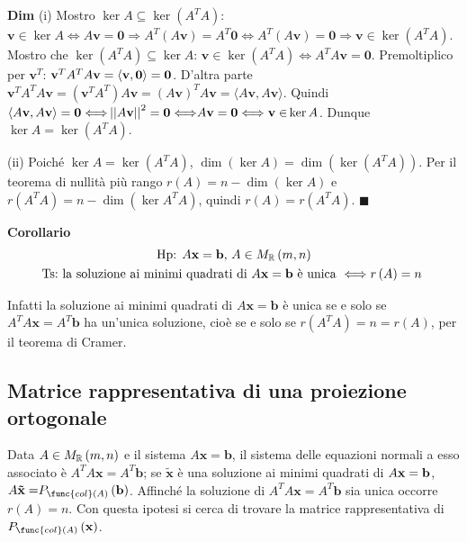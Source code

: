 \documentclass{article}
\begin{document}
\textbf{Dim} (i) Mostro $\ker A\subseteq \ker \left( A^{T}A\right) $: $%
\mathbf{v}\in \ker A\Longleftrightarrow A\mathbf{v=0\Longrightarrow }%
A^{T}\left( A\mathbf{v}\right) \mathbf{=}A^{T}\mathbf{0}\Longleftrightarrow
A^{T}\left( A\mathbf{v}\right) =\mathbf{0\Longrightarrow v\in }\ker \left(
A^{T}A\right) $. Mostro che $\ker \left( A^{T}A\right) \subseteq \ker A$: $%
\mathbf{v}\in \ker \left( A^{T}A\right) \Longleftrightarrow A^{T}A\mathbf{v=0%
}$. Premoltiplico per $\mathbf{v}^{T}$: $\mathbf{v}^{T}A^{T}A\mathbf{%
v=\langle v},\mathbf{0\rangle =0}$. D'altra parte $\mathbf{v}^{T}A^{T}A%
\mathbf{v=}\left( \mathbf{v}^{T}A^{T}\right) A\mathbf{v=}\left( A\mathbf{v}%
\right) ^{T}A\mathbf{v=\langle }A\mathbf{v},A\mathbf{v\rangle }$. Quindi $%
\mathbf{\langle }A\mathbf{v},A\mathbf{v\rangle =0\Longleftrightarrow }%
\left\vert \left\vert A\mathbf{v}\right\vert \right\vert ^{2}=\mathbf{%
0\Longleftrightarrow }A\mathbf{v=0\Longleftrightarrow v\in }\ker A$. Dunque $%
\ker A=\ker \left( A^{T}A\right) $.

(ii) Poich\'{e} $\ker A=\ker \left( A^{T}A\right) $, $\dim \left( \ker
A\right) =\dim \left( \ker \left( A^{T}A\right) \right) $. Per il teorema di
nullit\`{a} pi\`{u} rango $r\left( A\right) =n-\dim \left( \ker A\right) $ e 
$r\left( A^{T}A\right) =n-\dim \left( \ker A^{T}A\right) $, quindi $r\left(
A\right) =r\left( A^{T}A\right) $. $\blacksquare $

\textbf{Corollario}%
\begin{gather*}
\text{Hp}\text{: }A\mathbf{x=b}\text{, }A\in M_{%
\mathbb{R}
}\left( m,n\right) \\
\text{Ts}\text{:}\text{ la soluzione ai minimi quadrati di }A\mathbf{x=b}%
\text{ \`{e} unica }\Longleftrightarrow r\left( A\right) =n\text{ }
\end{gather*}

Infatti la soluzione ai minimi quadrati di $A\mathbf{x=b}$ \`{e} unica se e
solo se $A^{T}A\mathbf{x=}A^{T}\mathbf{b}$ ha un'unica soluzione, cio\`{e}
se e solo se $r\left( A^{T}A\right) =n=r\left( A\right) $, per il teorema di
Cramer.

\subsection{Matrice rappresentativa di una proiezione ortogonale}

Data $A\in M_{%
\mathbb{R}
}\left( m,n\right) $ e il sistema $A\mathbf{x=b}$, il sistema delle
equazioni normali a esso associato \`{e} $A^{T}A\mathbf{x=}A^{T}\mathbf{b}$;
se $\mathbf{\tilde{x}}$ \`{e} una soluzione ai minimi quadrati di $A\mathbf{%
x=b}$, $A\mathbf{\tilde{x}=}P_{\func{col}\left( A\right) }\left( \mathbf{b}%
\right) $. Affinch\'{e} la soluzione di $A^{T}A\mathbf{x=}A^{T}\mathbf{b}$
sia unica occorre $r\left( A\right) =n$. Con questa ipotesi si cerca di
trovare la matrice rappresentativa di $P_{\func{col}\left( A\right) }\left( 
\mathbf{x}\right) $.
\end{document}
